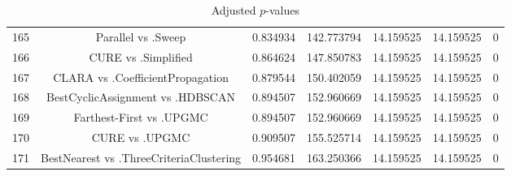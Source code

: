 \documentclass[a4paper,10pt]{article}
\begin{document}
\begin{landscape}
\begin{table}[!htp]
\begin{tabular}{ccccccc}
165&Parallel vs .Sweep&0.834934&142.773794&14.159525&14.159525&0\\
166&CURE vs .Simplified&0.864624&147.850783&14.159525&14.159525&0\\
167&CLARA vs .CoefficientPropagation&0.879544&150.402059&14.159525&14.159525&0\\
168&BestCyclicAssignment vs .HDBSCAN&0.894507&152.960669&14.159525&14.159525&0\\
169&Farthest-First vs .UPGMC&0.894507&152.960669&14.159525&14.159525&0\\
170&CURE vs .UPGMC&0.909507&155.525714&14.159525&14.159525&0\\
171&BestNearest vs .ThreeCriteriaClustering&0.954681&163.250366&14.159525&14.159525&0\\
\hline
\end{tabular}
\caption{Adjusted $p$-values}
\end{table}

\end{landscape}
\end{document}
